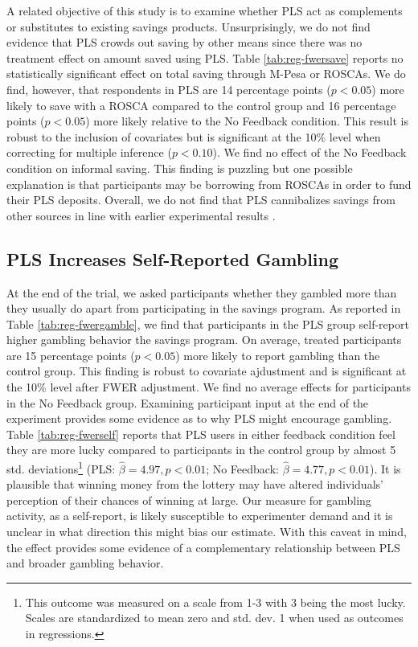 \documentclass[11pt]{article}
\begin{document}
		A related objective of this study is to examine whether PLS act as complements or substitutes to existing savings products. Unsurprisingly, we do not find evidence that PLS crowds out saving by other means since there was no treatment effect on amount saved using PLS. Table \ref{tab:reg-fwersave} reports no statistically significant effect on total saving through M-Pesa or ROSCAs. We do find, however, that respondents in PLS are 14 percentage points ($p < 0.05$) more likely to save with a ROSCA compared to the control group and 16 percentage points ($p < 0.05$) more likely relative to the No Feedback condition. This result is robust to the inclusion of covariates but is significant at the 10\% level when correcting for multiple inference ($p < 0.10$). We find no effect of the No Feedback condition on informal saving. This finding is puzzling but one possible explanation is that participants may be borrowing from ROSCAs in order to fund their PLS deposits. Overall, we do not find that PLS cannibalizes savings from other sources in line with earlier experimental results \parencite{atalay_savings_2014,filiz-ozbay_lottery_2015,dizon_leveraging_2016}.

		


	\subsection{PLS Increases Self-Reported Gambling}


		At the end of the trial, we asked participants whether they gambled more than they usually do apart from participating in the savings program. As reported in Table \ref{tab:reg-fwergamble}, we find that participants in the PLS group self-report higher gambling behavior the savings program. On average, treated participants are 15 percentage points ($p < 0.05$) more likely to report gambling than the control group. This finding is robust to covariate ajdustment and is significant at the 10\% level after FWER adjustment. We find no average effects for participants in the No Feedback group. Examining participant input at the end of the experiment provides some evidence as to why PLS might encourage gambling. Table \ref{tab:reg-fwerself} reports that PLS users in either feedback condition feel they are more lucky compared to participants in the control group by almost 5 std. deviations\footnote{This outcome was measured on a scale from 1-3 with 3 being the most lucky. Scales are standardized to mean zero and std. dev. 1 when used as outcomes in regressions.} (PLS: $\hat \beta = 4.97, p < 0.01$; No Feedback: $\hat \beta = 4.77, p < 0.01$). It is plausible that winning money from the lottery may have altered individuals' perception of their chances of winning at large. Our measure for gambling activity, as a self-report, is likely susceptible to experimenter demand and it is unclear in what direction this might bias our estimate. With this caveat in mind, the effect provides some evidence of a complementary relationship between PLS and broader gambling behavior.
\end{document}
